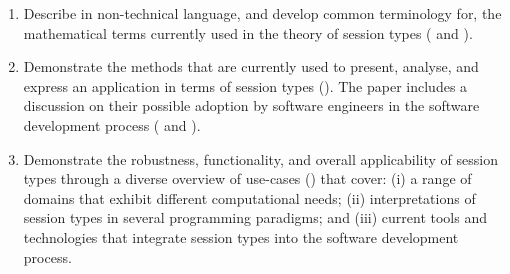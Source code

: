 \begin{enumerate}
	\item	Describe in non-technical language, and develop common terminology
			for, the mathematical terms currently used in the theory of
			session types ( and ).

	\item	Demonstrate the methods that are currently used to present,
			analyse, and express an application in terms of session types
			().
			The paper includes a discussion on their possible adoption by
			software engineers in the software development process
			( and ).


	\item	Demonstrate the robustness, functionality, and overall applicability
			of session types through a diverse overview of use-cases ()
			that cover:
			(i) a range of domains that exhibit different computational needs;
			(ii) interpretations of session types in several
			programming paradigms; and
			(iii) current tools and technologies that integrate session types
			into the software development process.
%
%
%
%

		
\end{enumerate}


